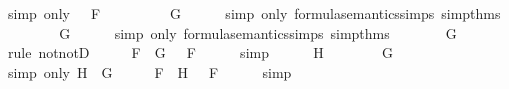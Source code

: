 \begin{isabellebody}
\ {\isacharparenleft}simp\ only{\isacharcolon}\ {\isacartoucheopen}{\isasymA}\ {\isasymTurnstile}\ F{\isacartoucheclose}{\isacharparenright}\isanewline
\ \ \isamarkupfalse%
\ \isamarkupfalse%
\ {\isachardoublequoteopen}{\isasymnot}\ {\isasymA}\ {\isasymTurnstile}\ \isactrlbold {\isasymnot}\ G{\isachardoublequoteclose}\isanewline
\ \ \ \ \isamarkupfalse%
\ {\isacharparenleft}simp\ only{\isacharcolon}\ formula{\isacharunderscore}semantics{\isachardot}simps{\isacharparenleft}{}{\isacharparenright}\ simp{\isacharunderscore}thms{\isacharparenleft}{}{\isacharparenright}{\isacharparenright}\isanewline
\ \ \isamarkupfalse%
\ \isamarkupfalse%
\ {\isachardoublequoteopen}{\isasymnot}\ {\isasymnot}{\isasymA}\ {\isasymTurnstile}\ G{\isachardoublequoteclose}\isanewline
\ \ \ \ \isamarkupfalse%
\ {\isacharparenleft}simp\ only{\isacharcolon}\ formula{\isacharunderscore}semantics{\isachardot}simps{\isacharparenleft}{}{\isacharparenright}\ simp{\isacharunderscore}thms{\isacharparenleft}{}{\isacharparenright}{\isacharparenright}\isanewline
\ \ \isamarkupfalse%
\ \isamarkupfalse%
\ {\isachardoublequoteopen}{\isasymA}\ {\isasymTurnstile}\ G{\isachardoublequoteclose}\isanewline
\ \ \ \ \isamarkupfalse%
\ {\isacharparenleft}rule\ notnotD{\isacharparenright}\isanewline
\ \ \isamarkupfalse%
\ \isamarkupfalse%
\ {}{\isacharcolon}{\isachardoublequoteopen}{\isasymforall}F\ {\isasymin}\ {\isacharbraceleft}G{\isacharbraceright}{\isachardot}\ {\isasymA}\ {\isasymTurnstile}\ F{\isachardoublequoteclose}\isanewline
\ \ \ \ \isamarkupfalse%
\ simp\isanewline
\ \ \isamarkupfalse%
\ {\isachardoublequoteopen}{\isasymA}\ {\isasymTurnstile}\ H{\isachardoublequoteclose}\isanewline
\ \ \ \ \isamarkupfalse%
\ {\isacartoucheopen}{\isasymA}\ {\isasymTurnstile}\ G{\isacartoucheclose}\ \isamarkupfalse%
\ {\isacharparenleft}simp\ only{\isacharcolon}\ {\isacartoucheopen}H\ {\isacharequal}\ G{\isacartoucheclose}{\isacharparenright}\isanewline
\ \ \isamarkupfalse%
\ \isamarkupfalse%
\ {}{\isacharcolon}{\isachardoublequoteopen}{\isasymforall}F\ {\isasymin}\ {\isacharbraceleft}H{\isacharbraceright}{\isachardot}\ {\isasymA}\ {\isasymTurnstile}\ F{\isachardoublequoteclose}\isanewline
\ \ \ \ \isamarkupfalse%
\ simp\isanewline
\ \ \isamarkupfalse%

\end{isabellebody}
